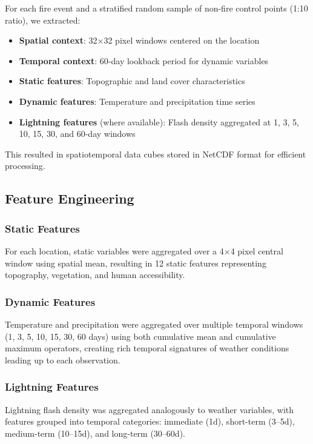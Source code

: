 \documentclass[11pt,a4paper]{article}
\begin{document}
For each fire event and a stratified random sample of non-fire control points (1:10 ratio), we extracted:

\begin{itemize}
    \item \textbf{Spatial context}: 32×32 pixel windows centered on the location
    \item \textbf{Temporal context}: 60-day lookback period for dynamic variables
    \item \textbf{Static features}: Topographic and land cover characteristics
    \item \textbf{Dynamic features}: Temperature and precipitation time series
    \item \textbf{Lightning features} (where available): Flash density aggregated at 1, 3, 5, 10, 15, 30, and 60-day windows
\end{itemize}

This resulted in spatiotemporal data cubes stored in NetCDF format for efficient processing.

\subsection{Feature Engineering}

\subsubsection{Static Features}
For each location, static variables were aggregated over a 4×4 pixel central window using spatial mean, resulting in 12 static features representing topography, vegetation, and human accessibility.

\subsubsection{Dynamic Features}
Temperature and precipitation were aggregated over multiple temporal windows (1, 3, 5, 10, 15, 30, 60 days) using both cumulative mean and cumulative maximum operators, creating rich temporal signatures of weather conditions leading up to each observation.

\subsubsection{Lightning Features}
Lightning flash density was aggregated analogously to weather variables, with features grouped into temporal categories: immediate (1d), short-term (3--5d), medium-term (10--15d), and long-term (30--60d).
\end{document}
